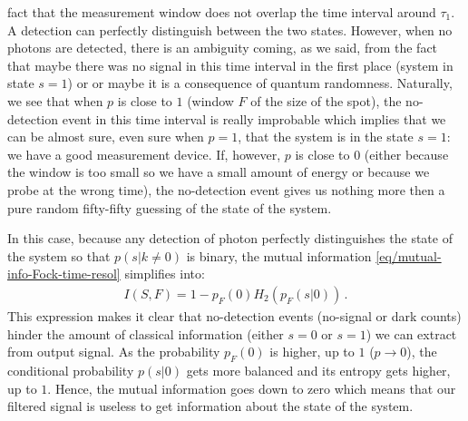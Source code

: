\begin{example}
fact that the measurement window does not overlap the time interval 
around $\tau_1$. A detection can perfectly distinguish between the
two states. However, when no photons are detected, there is an 
ambiguity coming, as we said, from the fact that maybe there was no
signal in this time interval in the first place (system in state $s=1$) or
or maybe it is a consequence of quantum randomness. Naturally,
we see that when $p$ is close to $1$ (window $F$ of the size of the
spot), the no-detection event in this time interval is really improbable
which implies that we can be almost sure, even sure when $p=1$, that
the system is in the state $s=1$: we have a good measurement device.
If, however, $p$ is close to $0$ (either because the window is too small
so we have a small amount of energy or because we probe
at the wrong time), the no-detection event gives us nothing more
then a pure random fifty-fifty guessing of the state of the system.

In this case, because any detection of photon perfectly distinguishes the
state of the system so that $p(s|k\ne 0)$ is binary, the mutual information 
\eqref{eq/mutual-info-Fock-time-resol} simplifies into:
%
\begin{align}
I(S,F) = 1 - p_F(0) H_2(p_F(s|0))
\,.
\end{align}
This expression makes it clear that no-detection events (no-signal or dark counts) 
hinder the amount of classical information (either $s=0$ or $s=1$) we can
extract from output signal. As the probability $p_F(0)$ is higher, up to $1$
($p \to 0$), the conditional probability $p(s|0)$ gets more balanced and its entropy 
gets higher, up to $1$. Hence, the mutual information goes down to zero which means
that our filtered signal is useless to get information about the state of the system.
\end{example}

